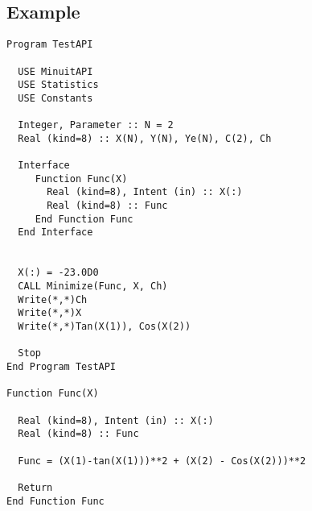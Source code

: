 \subsection{Example}

\begin{lstlisting}[emph=Minimize,
                   emphstyle=\color{blue},
                   frame=trBL,
                   caption=Using minuit library to minimize a function.,
                   label=minimize]
Program TestAPI

  USE MinuitAPI
  USE Statistics
  USE Constants

  Integer, Parameter :: N = 2
  Real (kind=8) :: X(N), Y(N), Ye(N), C(2), Ch

  Interface 
     Function Func(X)
       Real (kind=8), Intent (in) :: X(:)
       Real (kind=8) :: Func
     End Function Func
  End Interface
  

  X(:) = -23.0D0
  CALL Minimize(Func, X, Ch)
  Write(*,*)Ch
  Write(*,*)X
  Write(*,*)Tan(X(1)), Cos(X(2))

  Stop
End Program TestAPI

Function Func(X)

  Real (kind=8), Intent (in) :: X(:)
  Real (kind=8) :: Func

  Func = (X(1)-tan(X(1)))**2 + (X(2) - Cos(X(2)))**2

  Return
End Function Func
\end{lstlisting}






